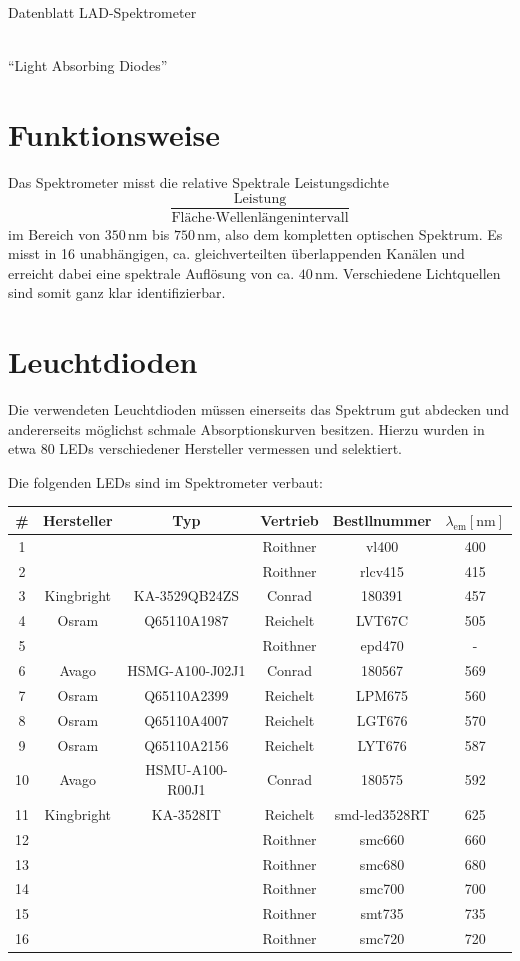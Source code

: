 \documentclass[a4paper, 12pt]{scrartcl}
\newcommand{\unit}[1]{\ensuremath{\,\mathrm{#1}}}
\begin{document}
\begin{center}
\begin{Huge}
Datenblatt LAD-Spektrometer
\end{Huge}
\\[\baselineskip]
"`Light Absorbing Diodes"'
\end{center}


\section{Funktionsweise}
Das Spektrometer misst die relative Spektrale Leistungsdichte
\[
\frac
{\text{Leistung}}
{\text{Fläche}\cdot\text{Wellenlängenintervall}}
\]
im Bereich von $350\unit{nm}$ bis $750\unit{nm}$, also dem kompletten optischen Spektrum.
Es misst in 16 unabhängigen, ca. gleichverteilten überlappenden Kanälen und erreicht dabei eine spektrale Auflösung von ca. $40\unit{nm}$.
Verschiedene Lichtquellen sind somit ganz klar identifizierbar.



\section{Leuchtdioden}
Die verwendeten Leuchtdioden müssen einerseits das Spektrum gut abdecken und andererseits möglichst schmale Absorptionskurven besitzen.
Hierzu wurden in etwa 80 LEDs verschiedener Hersteller vermessen und selektiert.

Die folgenden LEDs sind im Spektrometer verbaut:

{\centering
\begin{tabular}{c|c|c|c|c|c}
\# & Hersteller & Typ & Vertrieb & Bestllnummer & $\lambda_\text{em} [\mathrm{nm}]$ \\
\hline
1 & & & Roithner & vl400 & 400\\
2 & & & Roithner & rlcv415 & 415\\
3 & Kingbright & KA-3529QB24ZS & Conrad & 180391 & 457\\
4 & Osram & Q65110A1987 & Reichelt & LVT67C & 505\\
5 & & & Roithner & epd470 & -\\
6 & Avago & HSMG-A100-J02J1 & Conrad & 180567 & 569\\
7 & Osram & Q65110A2399 & Reichelt & LPM675 & 560\\
8 & Osram & Q65110A4007 & Reichelt & LGT676 & 570\\
9 & Osram & Q65110A2156 & Reichelt & LYT676 & 587\\
10 & Avago & HSMU-A100-R00J1 & Conrad & 180575 & 592\\
11 & Kingbright & KA-3528IT & Reichelt & smd-led3528RT & 625\\
12 & & & Roithner & smc660 & 660\\
13 & & & Roithner & smc680 & 680\\
14 & & & Roithner & smc700 & 700\\
15 & & & Roithner & smt735 & 735\\
16 & & & Roithner & smc720 & 720\\
\end{tabular}}
\end{document}

